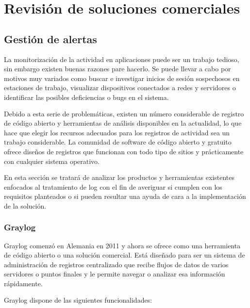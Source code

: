 \chapter{Revisión de soluciones comerciales}

\section{Gestión de alertas}

La monitorización de la actividad en aplicaciones puede ser un trabajo tedioso, sin embargo existen buenas razones pare hacerlo. Se puede llevar a cabo por motivos muy variados como buscar e investigar inicios de sesión sospechosos en estaciones de trabajo, visualizar dispositivos conectados a redes y servidores o identificar las posibles deficiencias o bugs en el sistema. 

Debido a esta serie de problemáticas, existen un número considerable de registro de código abierto y herramientas de análisis disponibles en la actualidad, lo que hace que elegir los recursos adecuados para los registros de actividad sea un trabajo considerable. La comunidad de software de código abierto y gratuito ofrece diseños de registros que funcionan con todo tipo de sitios y prácticamente con cualquier sistema operativo. 

En esta sección se tratará de analizar los productos y herramientas existentes enfocados al tratamiento de log con el fin de averiguar si cumplen con los requisitos planteados o si pueden resultar una ayuda de cara a la implementación de la solución.

\subsection{Graylog}

Graylog comenzó en Alemania en 2011 y ahora se ofrece como una herramienta de código abierto o una solución comercial. Está diseñado para ser un sistema de administración de registros centralizado que recibe flujos de datos de varios servidores o puntos finales y le permite navegar o analizar esa información rápidamente.

Graylog dispone de las siguientes funcionalidades:

